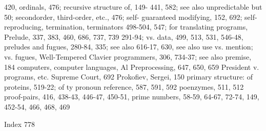 420,                                            ordinals, 476; recursive structure of, 149-
441, 582; see also unpredictable but            50; secondorder, third-order, etc., 476; self-
guaranteed                                      modifying, 152, 692; self-reproducing,
termination, terminators                        498-504, 547; for translating programs,
Prelude, 337, 383, 460, 686, 737, 739           291-94; vs. data, 499, 513, 531, 546-48,
preludes and fugues, 280-84, 335; see also      616-17, 630, see also use vs. mention; vs.
fugues, Well-Tempered Clavier                   programmers, 306, 734-37; see also
premise, 184                                    computers, computer languages, Al
Preprocessing, 647, 650, 659 President v.       programs, etc.
Supreme Court, 692                              Prokofiev, Sergei, 150
primary structure: of proteins, 519-22; of ty   pronoun reference, 587, 591, 592
poenzymes, 511, 512                             proof-pairs, 416, 438-43, 446-47, 450-51,
prime numbers, 58-59, 64-67, 72-74, 149,        452-54, 466, 468, 469



Index                                                                                     778


